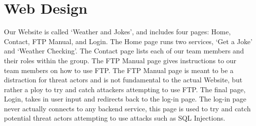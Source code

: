 \section{Web Design}

Our Website is called ‘Weather and Jokes’, and includes four pages: Home, Contact, FTP Manual, and Login. The Home page runs two services, ‘Get a Joke’ and ‘Weather Checking’. The Contact page lists each of our team members and their roles within the group. The FTP Manual page gives instructions to our team members on how to use FTP. The FTP Manual page is meant to be a distraction for threat actors and is not fundamental to the actual Website, but rather a ploy to try and catch attackers attempting to use FTP. The final page, Login, takes in user input and redirects back to the log-in page. The log-in page never actually connects to any backend service, this page is used to try and catch potential threat actors attempting to use attacks such as SQL Injections.
